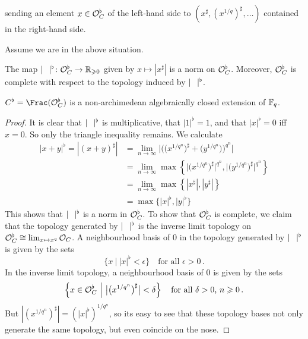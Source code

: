 \documentclass[a4paper, 10pt, oneside, DIV=9, chapterprefix=true, numbers=enddot,bibliography=totoc]{scrbook}
\begin{document}
sending an element $x\in \mathcal{O}_C^\flat$ of the left-hand side to $(x^\sharp, (x^{1/q})^\sharp,\dotsc)$ contained in the right-hand side.
\begin{lem}\label{lem:OcflatisOF}
	Assume we are in the above situation.
	\begin{numerate}
		\item The map $|\blank|^\flat\colon \Oo_C^\flat\morphism\IR_{\geq 0}$ given by $x\mapsto |x^\sharp|$ is a norm on $\mathcal{O}_C^\flat$. Moreover, $\mathcal{O}_C^\flat$ is complete with respect to the topology induced by $|\blank|^\flat$.
		\item $C^\flat=\Frac(\Oo_C^\flat)$ is a non-archimedean algebraically closed extension of $\mathbb{F}_q$.
	\end{numerate}
\end{lem}
\begin{proof}
	It is clear that $|\blank|^\flat$ is multiplicative, that $|1|^\flat=1$, and that $|x|^\flat=0$ iff $x=0$. So only the triangle inequality remains. We calculate
	\begin{align*}
		|x+y|^\flat=|(x+y)^\sharp|&=\lim_{n\to\infty}\bigg|\Big(\big(x^{1/q^n}\big)^\sharp+\big(y^{1/q^n}\big)\Big)^{q^n}\bigg|\\
		&=\lim_{n\to\infty}\max\left\{\big|\big(x^{1/q^n}\big)^\sharp\big|^{q^n},\big|\big(y^{1/q^n}\big)^\sharp\big|^{q^n}\right\}\\
		&=\lim_{n\to\infty}\max\left\{|x^\sharp|,|y^\sharp|\right\}\\
		&=\max\big\{|x|^\flat,|y|^\flat\big\}
	\end{align*}
	This shows that $|\blank|^\flat$ is a norm in $\mathcal{O}_C^\flat$. To show that $\mathcal{O}_C^\flat$ is complete, we claim that the topology generated by $|\blank|^\flat$ is the inverse limit topology on $\mathcal{O}_C^\flat\cong \lim_{x\mapsto x^q}\mathcal{O}_C$. A neighbourhood basis of $0$ in the topology generated by $|\blank|^\flat$ is given by the sets
	\begin{equation*}
		\big\{x\ \big|\ |x|^\flat<\epsilon\big\}\quad\text{for all }\epsilon>0\,.
	\end{equation*}
	In the inverse limit topology, a neighbourhood basis of $0$ is given by the sets
	\begin{equation*}
		\left\{x\in \mathcal{O}_C^\flat\ \middle|\  \big|\big(x^{1/q^n}\big)^\sharp\big|<\delta\right\}\quad\text{for all }\delta>0\text{, }n\geqslant 0\,.
	\end{equation*}
	But $|(x^{1/q^n})^\sharp|=(|x|^\flat)^{1/q^n}$, so its easy to see that these topology bases not only generate the same topology, but even coincide on the nose.
	

\end{proof}
\end{document}
